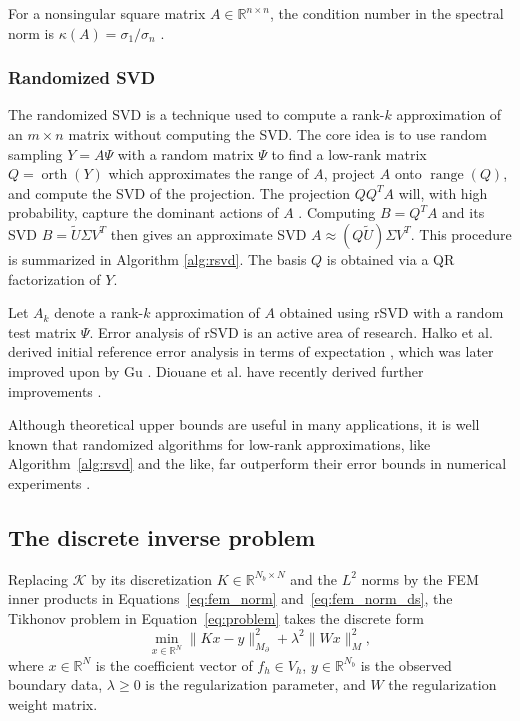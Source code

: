 For a nonsingular square matrix $A\in\mathbb R^{n\times n}$, the condition number in the spectral norm is $\kappa(A)=\sigma_1/\sigma_n$ \cite{hansen2010discrete}.


\subsubsection{Randomized SVD}
The randomized SVD is a technique used to compute a rank-$k$ approximation of an $m\times n$ matrix without computing the SVD. The core idea is to use random sampling $Y = A \Psi$ with a random matrix $\Psi$ to find a low-rank matrix $Q = \operatorname{orth}(Y)$ which approximates the range of $A$, project $A$ onto $\operatorname{range}(Q)$, and compute the SVD of the projection. The projection $QQ^T A$ will, with high probability, capture the dominant actions of $A$ \cite{halkoFindingStructureRandomness2011}. Computing $B = Q^T A$ and its SVD $B = \tilde U \Sigma V^T$ then gives an approximate SVD $A \approx (Q \tilde U) \Sigma V^T$. This procedure is summarized in Algorithm \ref{alg:rsvd}. The basis $Q$ is obtained via a QR factorization of $Y$.

Let $A_k$ denote a rank-$k$ approximation of $A$ obtained using rSVD with a random test matrix $\Psi$. Error analysis of rSVD is an active area of research. Halko et al. derived initial reference error analysis in terms of expectation \cite{halkoFindingStructureRandomness2011}, which was later improved upon by Gu \cite{guSubspaceIterationRandomization2015}. Diouane et al. have recently derived further improvements \cite{diouaneGeneralErrorAnalysis2022}.

Although theoretical upper bounds are useful in many applications, it is well known that randomized algorithms for low-rank approximations, like Algorithm~\ref{alg:rsvd} and the like, far outperform their error bounds in numerical experiments \cite{halkoFindingStructureRandomness2011,guSubspaceIterationRandomization2015,rokhlinFastRandomizedAlgorithm2008}.



\subsection{The discrete inverse problem}\label{sec:the_discrete_inverse_problem}

Replacing $\mathcal{K}$ by its discretization $K \in \mathbb{R}^{N_b \times N}$ and the $L^2$ norms by the FEM inner products in Equations~\eqref{eq:fem_norm} and~\eqref{eq:fem_norm_ds}, the Tikhonov problem in Equation~\eqref{eq:problem} takes the discrete form
\begin{equation}\label{eq:discrete_inverse_problem}
    \min_{x \in \mathbb{R}^N}
    \| K x - y \|_{M_\partial}^2
    + \lambda^2 \| W x \|_M^2,
\end{equation}
where $x \in \mathbb{R}^N$ is the coefficient vector of $f_h \in V_h$, $y \in \mathbb{R}^{N_b}$ is the observed boundary data, $\lambda \ge 0$ is the regularization parameter, and $W$ the regularization weight matrix.

